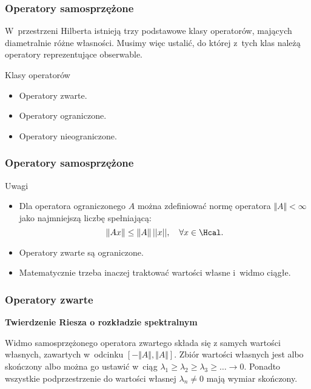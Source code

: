 \documentclass[10pt,t]{beamer}
\begin{document}
\begin{frame}
  \frametitle{Operatory samosprzężone}


  W~przestrzeni Hilberta istnieją trzy podstawowe klasy operatorów, mających
  diametralnie różne własności. Musimy więc ustalić, do której z~tych klas
  należą operatory reprezentujące obserwable.

  Klasy operatorów
  \begin{itemize}

  \item Operatory zwarte.

  \item Operatory ograniczone.

  \item Operatory nieograniczone.

  \end{itemize}

\end{frame}





\begin{frame}
  \frametitle{Operatory samosprzężone}


  Uwagi
  \begin{itemize}

  \item Dla operatora ograniczonego $A$ można zdefiniować normę operatora
    $\Vert A \Vert < \infty$ jako najmniejszą liczbę spełniającą:
    \begin{equation}
      \label{eq:Matematyczna-strona-03}
      \Vert A x \Vert \leq \Vert A \Vert \, || x ||, \quad
      \forall x \in \Hcal.
    \end{equation}

  \item Operatory zwarte są ograniczone.

  \item Matematycznie trzeba inaczej traktować wartości własne i~widmo
    ciągłe.

  \end{itemize}

\end{frame}





\begin{frame}
  \frametitle{Operatory zwarte}


  \textbf{Twierdzenie Riesza o rozkładzie spektralnym}

  Widmo samosprzężonego operatora zwartego składa się z samych wartości
  własnych, zawartych w~odcinku $[ -\Vert A \Vert, \Vert A \Vert ]$. Zbiór wartości
  własnych jest albo skończony albo można go ustawić w~ciąg
  $\lambda_{ 1 } \geq \lambda_{ 2 } \geq \lambda_{ 3 } \geq \ldots \to 0$. Ponadto wszystkie podprzestrzenie
  do wartości własnej $\lambda_{ n } \neq 0$ mają wymiar skończony.

\end{frame}
\end{document}

